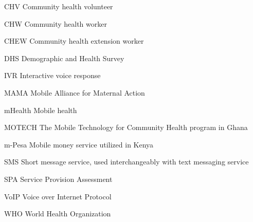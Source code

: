 \abbreviations


%
%
%
%

\begin{symbollist}
	\item[CHV] Community health volunteer
	\item[CHW] Community health worker
	\item[CHEW] Community health extension worker
	\item[DHS] Demographic and Health Survey
	\item[IVR] Interactive voice response
	\item[MAMA] Mobile Alliance for Maternal Action
	\item[mHealth] Mobile health
	\item[MOTECH] The Mobile Technology for Community Health program in Ghana
	\item[m-Pesa] Mobile money service utilized in Kenya
	\item[SMS] Short message service, used interchangeably with text messaging service
	\item[SPA] Service Provision Assessment
	\item[VoIP] Voice over Internet Protocol
	\item[WHO] World Health Organization
\end{symbollist}
